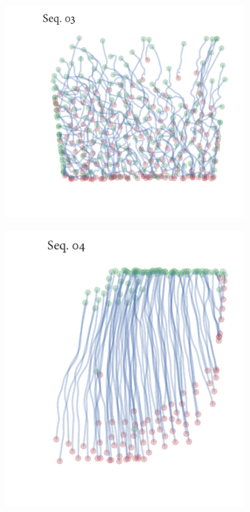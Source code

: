 \begin{figure}[h]
\begin{subfigure}[t]{0.5\textwidth}
		\includegraphics{streamline_sequence03.pdf}
	\end{subfigure}%
	\begin{subfigure}[t]{0.5\textwidth}
		\centering
		\includegraphics{streamline_sequence04.pdf}
	\end{subfigure}
	\begin{subfigure}[t]{0.5\textwidth}
		\centering

\end{subfigure}
\end{figure}
